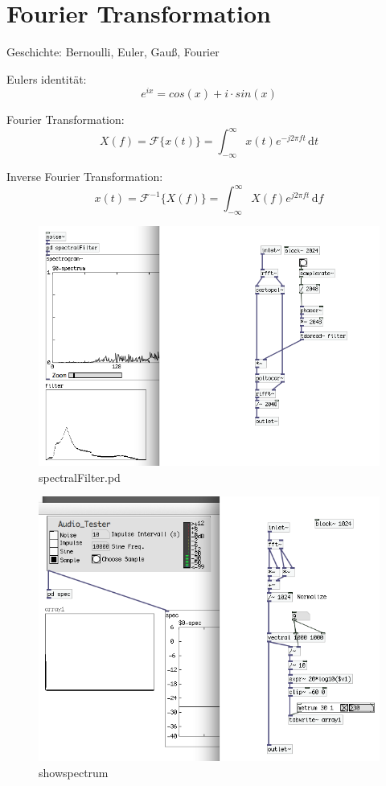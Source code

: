 \section{Fourier Transformation}

Geschichte:
Bernoulli, Euler, Gauß, Fourier

Eulers identität:
\begin{equation}
	e ^{ix} = cos(x)+i \cdot sin(x)
\end{equation}

Fourier Transformation:\\
\begin{equation}
	X(f)= \mathcal{F} \{x(t)\} = \int_{-\infty}^\infty \! x(t) e^{-j2\pi ft} \, \mathrm{d}t
\end{equation}

Inverse Fourier Transformation:\\
\begin{equation}
	x(t)= \mathcal{F}^{-1} \{X(f)\} = \int_{-\infty}^\infty \! X(f) e^{j2\pi ft} \, \mathrm{d}f
\end{equation}

\begin{figure}[h]
	\begin{center}
		\includegraphics[width = 14cm]{img/spectralFilter.png}
		\caption{spectralFilter.pd}
		\label{fig:spectralFilter}
	\end{center}
\end{figure}

\begin{figure}[h]
	\begin{center}
		\includegraphics[width = 14cm]{img/showspectrum.png}
		\caption{showspectrum}
		\label{fig:showspectrum}
	\end{center}
\end{figure}
